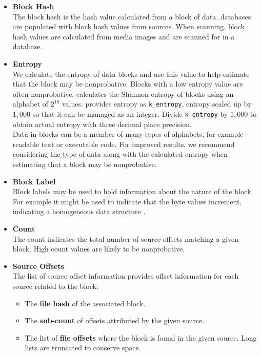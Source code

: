 \documentclass[11pt,fleqn]{article} %
\begin{document}
\begin{itemize}
\item \textbf{Block Hash}\\
The block hash is the hash value calculated from a block of data. \hdb databases are populated with block hash values from sources. When scanning, block hash values are calculated from media images and are scanned for in a \hdb database.
\item \textbf{Entropy}\\
We calculate the entropy of data blocks and use this value to help estimate that the block may be nonprobative. Blocks with a low entropy value are often nonprobative. \hdb calculates the Shannon entropy of blocks using an alphabet of $2^{16}$ values. \hdb provides entropy as \verb+k_entropy+, entropy scaled up by $1,000$ so that it can be managed as an integer. Divide \verb+k_entropy+ by $1,000$ to obtain actual entropy with three decimal place precision.\\

Data in blocks can be a member of many types of alphabets, for example readable text or executable code. For improved results, we recommend considering the type of data along with the calculated entropy when estimating that a block may be nonprobative.
\item \textbf{Block Label}\\
Block labels may be used to hold information about the nature of the block.  For example it might be used to indicate that the byte values increment, indicating a homogeneous data structure \cite{hashBasedCarving}.
\item \textbf{Count}\\
The count indicates the total number of source offsets matching a given block. High count values are likely to be nonprobative.
\item \textbf{Source Offsets}\\
The list of source offset information provides offset information for each source related to the block:
  \begin{itemize}
  \item The \textbf{file hash} of the associated block.
  \item The \textbf{sub-count} of offsets attributed by the given source.
  \item The list of \textbf{file offsets} where the block is found in the given source. Long lists are truncated to conserve space.
  \end{itemize}
\end{itemize}
\end{document}
